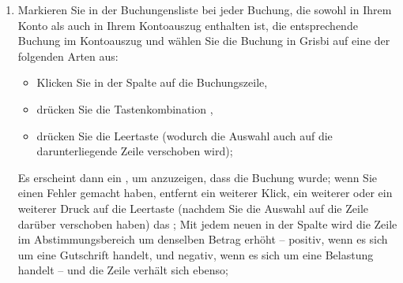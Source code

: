 \begin{enumerate}
	\item Markieren Sie in der Buchungensliste bei jeder Buchung, die sowohl in Ihrem Konto als auch in Ihrem Kontoauszug enthalten ist, die entsprechende Buchung im Kontoauszug und wählen Sie die Buchung in Grisbi auf eine der folgenden Arten aus:
	\begin{itemize}
		\item Klicken Sie in der Spalte   auf die Buchungszeile,
		\item drücken Sie die Tastenkombination ,
		\item drücken Sie die Leertaste (wodurch die Auswahl auch auf die darunterliegende Zeile verschoben wird);
	\end{itemize}	 
	Es erscheint dann ein , um anzuzeigen, dass die Buchung  wurde; wenn Sie einen Fehler gemacht haben, entfernt ein weiterer Klick, ein weiterer  oder ein weiterer Druck auf die Leertaste (nachdem Sie die Auswahl auf die Zeile darüber verschoben haben) das ; Mit jedem neuen  in der Spalte  wird die Zeile  im Abstimmungsbereich um denselben Betrag erhöht – positiv, wenn es sich um eine Gutschrift handelt, und negativ, wenn es sich um eine Belastung handelt – und die Zeile  verhält sich ebenso;

\end{enumerate}
